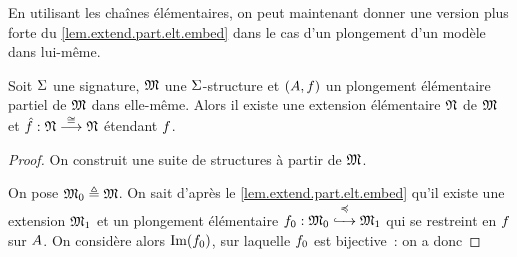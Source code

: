 En utilisant les chaînes élémentaires, on peut maintenant donner une version
plus forte du \cref{lem.extend.part.elt.embed} dans le cas d'un plongement
d'un modèle dans lui-même.

\begin{proposition}
  Soit $\Sigma$ une signature, $\mathfrak{M}$ une $\Sigma$-structure et
  $(A,f)$ un plongement élémentaire partiel de $\mathfrak{M}$ dans
  elle-même. Alors il existe une extension élémentaire $\mathfrak{N}$ de $\mathfrak{M}$
  et $\hat{f} : \displaystyle \mathfrak{N} \overset{\cong}{\longrightarrow} \mathfrak{N}$ étendant $f$.
\end{proposition}

\begin{proof}
  On construit une suite de structures à partir de $\mathfrak{M}$.

  \vspace{5pt}
  \begin{minipage}{0.3\textwidth}
  \end{minipage}
  \begin{minipage}{0.65\textwidth}
    On pose $\mathfrak{M}_0 \triangleq \mathfrak{M}$.
    On sait d'après le \cref{lem.extend.part.elt.embed} qu'il existe une
    extension $\mathfrak{M}_1$ et un plongement élémentaire
    $f_0 : \displaystyle \mathfrak{M}_0 \overset{\preccurlyeq}{\xhookrightarrow{\quad}} \mathfrak{M}_1$ qui se restreint en
    $f$ sur $A$. On considère alors $\operatorname{Im}(f_0)$, sur
    laquelle $f_0$ est bijective~: on a donc

\end{minipage}
\end{proof}
